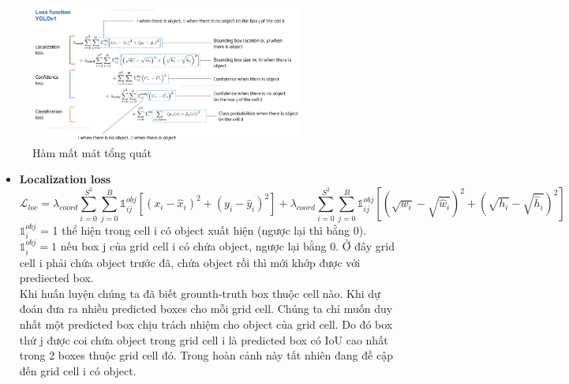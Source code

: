 \begin{figure}[htbp]
        \centering
        \includegraphics[width=0.8\textwidth]{images/2a-sign/YOLO_loss.png}
        \caption{Hàm mất mát tổng quát}
\end{figure}
\begin{itemize}
    \item \textbf{Localization loss}
    \begin{equation*}
\mathcal{L}_{loc} = \lambda_{coord} \sum_{i=0}^{S^2} \sum_{j=0}^B \mathds{1}_{ij}^{obj} [(x_i - \hat{x}_i)^2 + (y_i - \hat{y}_i)^2 ] +\lambda_{coord} \sum_{i=0}^{S^2} \sum_{j=0}^B \mathds{1}_{ij}^{obj} [(\sqrt{w_i} - \sqrt{\hat{w}_i})^2 + (\sqrt{h_i} - \sqrt{\hat{h}_i})^2]
    \end{equation*}
$\mathds{1}_{i}^{obj}$ = 1 thể hiện trong cell i có object xuất hiện (ngược lại thì bằng 0).\\
$\mathds{1}_{i}^{obj} = 1$ nếu box j của grid cell i có chứa object, ngược lại bằng 0. Ở đây grid cell i phải chứa object trước đã, chứa object rồi thì mới khớp được với prediected box.\\

Khi huấn luyện chúng ta đã biết grounth-truth box thuộc cell nào. Khi dự đoán đưa ra nhiều predicted boxes cho mỗi grid cell. Chúng ta chỉ muốn duy nhất một predicted box chịu trách nhiệm cho object của grid cell. Do đó box thứ j được coi chứa object trong grid cell i là predicted box có IoU cao nhất trong 2 boxes thuộc grid cell đó. Trong hoàn cảnh này tất nhiên đang đề cập đến grid cell i
 có object.
\begin{figure}[htbp]
    \centering
\end{figure}


\end{itemize}
